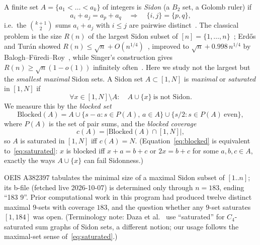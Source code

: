 \documentclass[11pt,a4paper]{article}
\theoremstyle{definition}
\begin{document}
A finite set $A=\{a_1<\dots<a_k\}$ of integers is \emph{Sidon} (a $B_2$
set, a Golomb ruler) if
\begin{equation}
  \label{eq:sidon}
  a_i+a_j=a_p+a_q \quad\Longrightarrow\quad \{i,j\}=\{p,q\},
\end{equation}
i.e.\ the $\binom{k+1}{2}$ sums $a_i+a_j$ with $i\le j$ are pairwise
distinct~\cite{ET41}. The classical problem is the size $R(n)$ of the
largest Sidon subset of $[n]=\{1,\dots,n\}$~\cite{Bli13}; Erd\H{o}s and
Tur\'an showed $R(n)\le\sqrt{n}+O(n^{1/4})$~\cite{ET41}, improved to
$\sqrt{n}+0.998\,n^{1/4}$ by Balogh--F\"uredi--Roy~\cite{BFR21}, while
Singer's construction gives $R(n)\ge\sqrt{n}(1-o(1))$ infinitely
often~\cite{Sin38}. Here we study not the largest but the
\emph{smallest maximal} Sidon sets. A Sidon set $A\subset[1,N]$ is
\emph{maximal} or \emph{saturated} in $[1,N]$ if
\begin{equation}
  \label{eq:saturated}
  \forall x\in[1,N]\setminus A:\quad A\cup\{x\}\ \text{is not Sidon}.
\end{equation}
We measure this by the \emph{blocked set}
\begin{equation}
  \label{eq:blocked}
  \mathrm{Blocked}(A)=A\cup\{s-a:s\in P(A),\,a\in A\}
                     \cup\{s/2:s\in P(A)\ \text{even}\},
\end{equation}
where $P(A)$ is the set of pair sums, and the \emph{blocked coverage}
\begin{equation}
  \label{eq:coverage}
  c(A)=|\mathrm{Blocked}(A)\cap[1,N]|,
\end{equation}
so $A$ is saturated in $[1,N]$ iff $c(A)=N$. (Equation~\eqref{eq:blocked}
is equivalent to~\eqref{eq:saturated}: $x$ is blocked iff $x+a=b+c$ or
$2x=b+c$ for some $a,b,c\in A$, exactly the ways $A\cup\{x\}$ can fail
Sidonness.)

OEIS A382397 tabulates the minimal size of a maximal Sidon subset of
$[1..n]$; its b-file (fetched live 2026-10-07) is determined only through
$n=183$, ending ``183 9''. Prior computational work in this program had
produced twelve distinct maximal $9$-sets with coverage $183$, and the
question whether any $9$-set saturates $[1,184]$ was open. (Terminology
note: Daza et al.~\cite{Daz18} use ``saturated'' for $C_4$-saturated sum
graphs of Sidon sets, a different notion; our usage follows the
maximal-set sense of~\eqref{eq:saturated}.)
\end{document}
